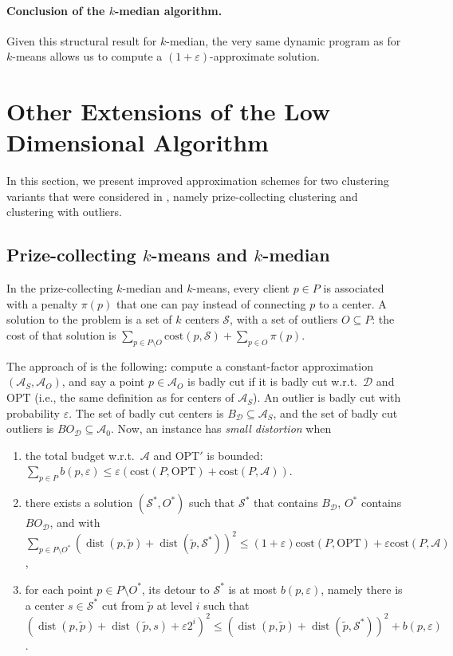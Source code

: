 \documentclass[11pt]{article}
\newcommand{\opt}{\text{OPT}}
\newcommand{\eps}{\varepsilon}
\newcommand{\cost}{\mathrm{cost}}
\renewcommand{\tilde}{\widetilde}
\newcommand{\calD}{\mathcal {D}}
\newcommand{\calS}{\mathcal {S}}
\newcommand{\calL}{\mathcal{A}}
\newcommand{\badcut}{\eps}
\DeclareMathOperator{\dist}{dist}
\newcommand{\lpar}{\left(}
\newcommand{\rpar}{\right)}
\newcommand{\david}[1]{\textcolor{orange}{#1}}
\begin{document}
\paragraph{Conclusion of the $k$-median algorithm.} Given this structural result for $k$-median, the very same dynamic program as for $k$-means allows us to compute a $(1+\eps)$-approximate solution. 


\section{Other Extensions of the Low Dimensional Algorithm}\label{app:extension}
In this section, we present improved approximation schemes for two clustering variants that were considered in \cite{jacm}, namely prize-collecting clustering and clustering with outliers.

\subsection{Prize-collecting $k$-means and $k$-median}
In the prize-collecting $k$-median and $k$-means, every client $p \in P$ is associated with a penalty $\pi(p)$ that one can pay instead of connecting $p$ to a center. A solution to the problem is a set of $k$ centers $\calS$, with a set of outliers $O \subseteq P$: the cost of that solution is $\sum_{p \in P \setminus O} \cost(p, \calS) + \sum_{p \in O} \pi(p)$. 

The approach of \cite{jacm} is the following: compute a constant-factor approximation $(\calL_S, \calL_O)$, and say a point $p \in \calL_O$ is badly cut if it is badly cut w.r.t.\ $\calD$ and $\opt$ (i.e., the same definition as for centers of $\calL_S$). An outlier is badly cut with probability $\badcut$. The set of badly cut centers is $B_\calD \subseteq \calL_S$, and the set of badly cut outliers is $BO_\calD \subseteq \calL_0$.
Now, an instance has \emph{small distortion} when 
\begin{enumerate}
\item\label{prop:budget-pc} the total budget w.r.t.\ $\calL$ and $\opt'$ is bounded: $\sum_{p \in P} b(p, \eps) \leq \eps (\cost(P, \opt) + \cost(P, \calL))$.
\item\label{prop:costSstar-pc} there exists a solution $(\calS^*, O^*)$ such that $\calS^*$ that contains $B_{\calD}$, $O^*$ contains $BO_\calD$, and
with \\
$\sum_{p \in P \setminus O^*} \lpar \dist(p, \tilde p) + \dist(\tilde p,  \calS^*)\rpar^2 \leq (1+\eps)\cost(P, \opt) + \eps \cost(P, \calL)$,
\item\label{prop:det-pc} for each point $p \in P \setminus O^*$, its detour to $\calS^*$ is at most $b(p, \eps)$, namely there is a center $s \in \calS^*$ cut from $\tilde p$ at level $i$ such that $(\dist(p, \tilde p) + \dist(\tilde p, s) + \eps 2^i)^2 \leq \lpar\dist(p, \tilde p) + \dist(\tilde p, \calS^*)\rpar^2 + b(p, \eps)$.
\end{enumerate}
\end{document}
